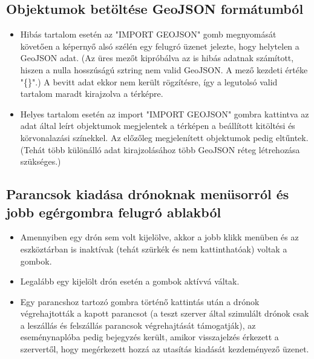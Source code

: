 \subsection{Objektumok betöltése GeoJSON formátumból}

\begin{itemize}

  \item Hibás tartalom esetén az "IMPORT GEOJSON" gomb megnyomását követően a
  képernyő alsó szélén egy felugró üzenet jelezte, hogy helytelen a GeoJSON
  adat. (Az üres mezőt kipróbálva az is hibás adatnak számított, hiszen a nulla
  hosszúságú sztring nem valid GeoJSON. A mező kezdeti értéke "\{\}".) A bevitt
  adat ekkor nem került rögzítésre, így a legutolsó valid tartalom maradt
  kirajzolva a térképre.

  \item Helyes tartalom esetén az import "IMPORT GEOJSON" gombra kattintva az
  adat által leírt objektumok megjelentek a térképen a beállított kitöltési és
  körvonalazási színekkel. Az előzőleg megjelenített objektumok pedig eltűntek.
  (Tehát több különálló adat kirajzolásához több GeoJSON réteg létrehozása
  szükséges.)

\end{itemize}


\subsection{Parancsok kiadása drónoknak menüsorról és jobb egérgombra felugró ablakból}

\begin{itemize}

  \item Amennyiben egy drón sem volt kijelölve, akkor a jobb klikk menüben és az
  eszköztárban is inaktívak (tehát szürkék és nem kattinthatóak) voltak a
  gombok.

  \item Legalább egy kijelölt drón esetén a gombok aktívvá váltak.

  \item Egy parancshoz tartozó gombra történő kattintás után a drónok
  végrehajtották a kapott parancsot (a teszt szerver által szimulált drónok csak
  a leszállás és felszállás parancsok végrehajtását támogatják), az
  eseménynaplóba pedig bejegyzés került, amikor visszajelzés érkezett a
  szervertől, hogy megérkezett hozzá az utasítás kiadását kezdeményező üzenet.

\end{itemize}


